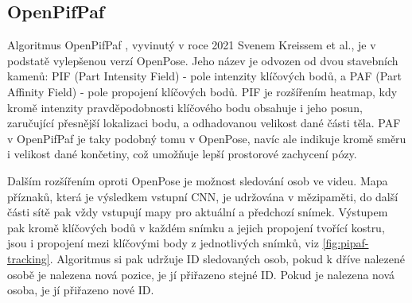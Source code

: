\subsection{OpenPifPaf}

Algoritmus OpenPifPaf \cite{openpifpaf}, vyvinutý v roce 2021 Svenem Kreissem
et al., je v podstatě vylepšenou verzí OpenPose. Jeho název je odvozen od dvou
stavebních kamenů: PIF (Part Intensity Field) - pole intenzity klíčových bodů,
a PAF (Part Affinity Field) - pole propojení klíčových bodů. PIF je rozšířením
heatmap, kdy kromě intenzity pravděpodobnosti klíčového bodu obsahuje i jeho
posun, zaručující přesnější lokalizaci bodu, a odhadovanou velikost dané části
těla. PAF v OpenPifPaf je taky podobný tomu v OpenPose, navíc ale indikuje
kromě směru i velikost dané končetiny, což umožňuje lepší prostorové zachycení
pózy.

Dalším rozšířením oproti OpenPose je možnost sledování osob ve videu. Mapa
příznaků, která je výsledkem vstupní CNN, je udržována v mězipaměti, do další
části sítě pak vždy vstupují mapy pro aktuální a předchozí snímek. Výstupem pak
kromě klíčových bodů v každém snímku a jejich propojení tvořící kostru, jsou i
propojení mezi klíčovými body z jednotlivých snímků, viz
\ref{fig:pipaf-tracking}. Algoritmus si pak udržuje ID sledovaných osob, pokud
k dříve nalezené osobě je nalezena nová pozice, je jí přiřazeno stejné ID.
Pokud je nalezena nová osoba, je jí přiřazeno nové ID.

